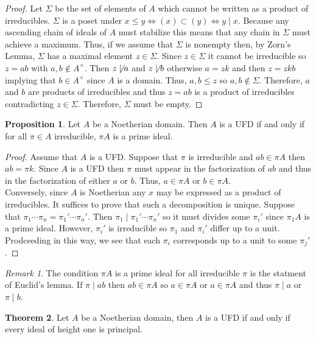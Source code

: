\documentclass[12pt]{article}
\newcommand{\divides}{\mid}
\theoremstyle{remark}
\newtheorem*{remark}{Remark}
\theoremstyle{definition}
\newtheorem{theorem}{Theorem}[section]
\newtheorem{proposition}[theorem]{Proposition}
\begin{document}
\begin{proof}
Let $\Sigma$ be the set of elements of $A$ which cannot be written as a product of irreducibles. $\Sigma$ is a poset under $x \le y \iff (x) \subset (y) \iff y \divides x$. Because any ascending chain of ideals of $A$ must stabilize this means that any chain in $\Sigma$ must achieve a maximum.  Thus, if we assume that $\Sigma$ is nonempty then, by Zorn's Lemma, $\Sigma$ has a maximal element $z \in \Sigma$. Since $z \in \Sigma$ it cannot be irreducible so $z = ab$ with $a, b \notin A^\times$. Then $z \not\divides a$ and $z \not\divides b$ otherwise $a = zk$ and then $z = z kb$ implying that $b \in A^\times$ since $A$ is a domain. Thus, $a, b \le z$ so $a,b \notin \Sigma$. Therefore, $a$ and $b$ are products of irreducibles and thus $z = ab$ is a product of irreducibles contradicting $z \in \Sigma$. Therefore, $\Sigma$ must be empty.   
\end{proof}

\begin{proposition}
Let $A$ be a Noetherian domain. Then $A$ is a UFD if and only if for all $\pi \in A$ irreducible, $\pi A$ is a prime ideal. 
\end{proposition}

\begin{proof}
Assume that $A$ is a UFD. Suppose that $\pi$ is irreducible and $ab \in \pi A$ then $ab = \pi k$. Since $A$ is a UFD then $\pi$ must appear in the factorization of $ab$ and thus in the factorization of either $a$ or $b$. Thus, $a \in \pi A$ or $b \in \pi A$.
\bigskip\\
Conversely, since $A$ is Noetherian any $x$ may be expressed as a product of irreducibles. It suffices to prove that such a decomposition is unique. Suppose that $\pi_1 \cdots \pi_n = \pi_1' \cdots \pi_n'$. Then $\pi_1 \divides \pi_1' \cdots \pi_n'$ so it must divides some $\pi_i'$ since $\pi_1 A$ is a prime ideal. However, $\pi_i'$ is irreducible so $\pi_1$ and $\pi_i'$ differ up to a unit. Prodceeding in this way, we see that each $\pi_i$ corresponds up to a unit to some $\pi_j'$. 
\end{proof}

\begin{remark}
The condition $\pi A$ is a prime ideal for all irreducible $\pi$ is the statment of Euclid's lemma. If $\pi \divides ab$ then $ab \in \pi A$ so $a \in \pi A$ or $a \in \pi A$ and thus $\pi \divides a$ or $\pi \divides b$. 
\end{remark}

\begin{theorem}
Let $A$ be a Noetherian domain, then $A$ is a UFD if and only if every ideal of height one is principal.
\end{theorem}
\end{document}
